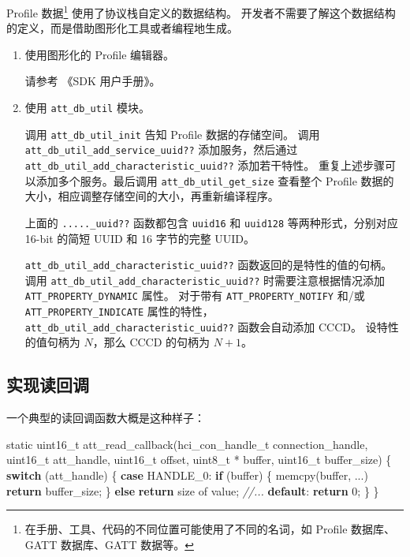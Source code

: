 \documentclass[
  12pt,
]{book}
\newenvironment{Shaded}{\begin{snugshade}}{\end{snugshade}}
\newcommand{\CommentTok}[1]{\textcolor[rgb]{0.56,0.35,0.01}{\textit{#1}}}
\newcommand{\ControlFlowTok}[1]{\textcolor[rgb]{0.13,0.29,0.53}{\textbf{#1}}}
\newcommand{\DataTypeTok}[1]{\textcolor[rgb]{0.13,0.29,0.53}{#1}}
\newcommand{\DecValTok}[1]{\textcolor[rgb]{0.00,0.00,0.81}{#1}}
\newcommand{\NormalTok}[1]{#1}
\begin{document}
Profile 数据\footnote{在手册、工具、代码的不同位置可能使用了不同的名词，如 Profile 数据库、GATT 数据库、GATT 数据等。} 使用了协议栈自定义的数据结构。
开发者不需要了解这个数据结构的定义，而是借助图形化工具或者编程地生成。

\begin{enumerate}
\def\labelenumi{\arabic{enumi}.}
\item
  使用图形化的 Profile 编辑器。

  请参考 《SDK 用户手册》。
\item
  使用 \texttt{att\_db\_util} 模块。

  调用 \texttt{att\_db\_util\_init} 告知 Profile 数据的存储空间。
  调用 \texttt{att\_db\_util\_add\_service\_uuid??} 添加服务，然后通过 \texttt{att\_db\_util\_add\_characteristic\_uuid??} 添加若干特性。
  重复上述步骤可以添加多个服务。最后调用 \texttt{att\_db\_util\_get\_size} 查看整个 Profile 数据的大小，相应调整存储空间的大小，再重新编译程序。

  上面的 \texttt{.....\_uuid??} 函数都包含 \texttt{uuid16} 和 \texttt{uuid128} 等两种形式，分别对应 16-bit 的简短 UUID 和 16 字节的完整 UUID。

  \texttt{att\_db\_util\_add\_characteristic\_uuid??} 函数返回的是特性的值的句柄。
  调用 \texttt{att\_db\_util\_add\_characteristic\_uuid??} 时需要注意根据情况添加 \texttt{ATT\_PROPERTY\_DYNAMIC} 属性。
  对于带有 \texttt{ATT\_PROPERTY\_NOTIFY} 和/或 \texttt{ATT\_PROPERTY\_INDICATE} 属性的特性，\texttt{att\_db\_util\_add\_characteristic\_uuid??} 函数会自动添加 CCCD。
  设特性的值句柄为 \(N\)，那么 CCCD 的句柄为 \(N + 1\)。
\end{enumerate}

\hypertarget{ux5b9eux73b0ux8bfbux56deux8c03}{%
\subsection{实现读回调}\label{ux5b9eux73b0ux8bfbux56deux8c03}}

一个典型的读回调函数大概是这种样子：

\begin{Shaded}
\begin{Highlighting}[]
\DataTypeTok{static} \DataTypeTok{uint16_t}\NormalTok{ att_read_callback(hci_con_handle_t connection_handle,}
  \DataTypeTok{uint16_t}\NormalTok{ att_handle, }\DataTypeTok{uint16_t}\NormalTok{ offset,}
  \DataTypeTok{uint8_t}\NormalTok{ * buffer, }\DataTypeTok{uint16_t}\NormalTok{ buffer_size)}
\NormalTok{\{}
    \ControlFlowTok{switch}\NormalTok{ (att_handle)}
\NormalTok{    \{}
    \ControlFlowTok{case}\NormalTok{ HANDLE_0:}
        \ControlFlowTok{if}\NormalTok{ (buffer)}
\NormalTok{        \{}
\NormalTok{            memcpy(buffer, ...)}
            \ControlFlowTok{return}\NormalTok{ buffer_size;}
\NormalTok{        \}}
        \ControlFlowTok{else}
            \ControlFlowTok{return}\NormalTok{ size of value;}
    \CommentTok{//...}
    \ControlFlowTok{default}\NormalTok{:}
        \ControlFlowTok{return} \DecValTok{0}\NormalTok{;}
\NormalTok{    \}}
\NormalTok{\}}
\end{Highlighting}
\end{Shaded}
\end{document}
